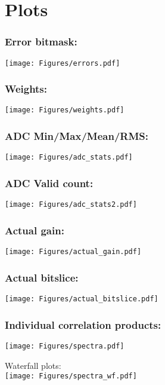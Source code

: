\section{Plots}

\subsubsection*{Error bitmask:}
\texttt{[image: Figures/errors.pdf]}

\subsubsection*{Weights:}
\texttt{[image: Figures/weights.pdf]}

\subsubsection*{ADC Min/Max/Mean/RMS:}
\texttt{[image: Figures/adc\_stats.pdf]}

\subsubsection*{ADC Valid count:}
\texttt{[image: Figures/adc\_stats2.pdf]}

\subsubsection*{Actual gain:}
\texttt{[image: Figures/actual\_gain.pdf]}

\subsubsection*{Actual bitslice:}
\texttt{[image: Figures/actual\_bitslice.pdf]}


\subsubsection*{Individual correlation products:}
\texttt{[image: Figures/spectra.pdf]}

\newpage
Waterfall plots:\\
\texttt{[image: Figures/spectra\_wf.pdf]}


